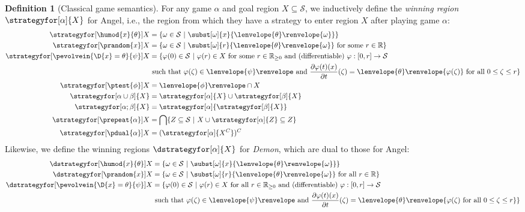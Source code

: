 \documentclass[12pt]{cmuthesis}
\theoremstyle{definition}
\newtheorem{definition}{Definition}
\theoremstyle{remark}
\newcommand{\ivr}{\psi}
\newcommand{\allstate}{\mathcal{S}}
\newcommand{\om}{\omega}
\newcommand{\tint}[2]{\lenvelope{#1}\renvelope{#2}}
\newcommand{\fint}[1]{\lenvelope{#1}\renvelope}
\begin{document}
\begin{definition}[Classical game semantics]\label{def:dgl-sem-game}
For any game $\alpha$ and goal region $X \subseteq \allstate$, we inductively define the \emph{winning region} $\strategyfor[\alpha]{X}$ for Angel, i.e., the region from which they have a strategy to enter region $X$ after playing game $\alpha$:
\begin{align*}
\strategyfor[\humod{x}{\theta}]{X} &= \{ \om \in \allstate~|~\subst[\om]{x}{\tint{\theta}{\om}}\} \\
\strategyfor[\prandom{x}]{X}       &= \{ \om \in \allstate~|~\subst[\om]{r}{\tint{\theta}{\om}}\text{ for some }r \in \mathbb{R}\} \\
\strategyfor[\pevolvein{\D{x}=\theta}{\ivr}]{X} &= \{\varphi(0) \in \allstate~|~\varphi(r) \in X\text{ for some }r \in \mathbb{R}_{\geq0}\text{ and (differentiable) }\varphi:[0,r]\to \allstate\\
&\text{ such that }\varphi(\zeta) \in \fint{\ivr}\text{ and } \frac{\partial \varphi(t)(x)}{\partial t}(\zeta) = \tint{\theta}{\varphi(\zeta)}\text{ for all }0 \leq \zeta \leq r \}\\
\strategyfor[\ptest{\phi}]{X}      &= \fint{\phi} \cap X \\
\strategyfor[\alpha \cup \beta]{X} &= \strategyfor[\alpha]{X} \cup \strategyfor[\beta]{X}\\
\strategyfor[\alpha;\beta]{X}      &= \strategyfor[\alpha]{\strategyfor[\beta]{X}}\\
\strategyfor[\prepeat{\alpha}]{X}  &= \bigcap\{Z \subseteq \allstate~|~ X \cup \strategyfor[\alpha]{Z} \subseteq Z\}\\
\strategyfor[\pdual{\alpha}]{X}    &= (\strategyfor[\alpha]{X^C})^C
\end{align*}
Likewise, we define the winning regions $\dstrategyfor[\alpha]{X}$ for \emph{Demon}, which are dual to those for Angel:
\begin{align*}
\dstrategyfor[\humod{x}{\theta}]{X} &= \{ \om \in \allstate~|~\subst[\om]{x}{\tint{\theta}{\om}}\}\\
\dstrategyfor[\prandom{x}]{X}       &= \{ \om \in \allstate~|~\subst[\om]{r}{\tint{\theta}{\om}}\text{ for all }r \in \mathbb{R}\} \\
\dstrategyfor[\pevolvein{\D{x}=\theta}{\ivr}]{X} &= \{\varphi(0) \in \allstate~|~\varphi(r) \in X\text{ for all }r \in \mathbb{R}_{\geq0}\text{ and (differentiable) }\varphi:[0,r]\to\allstate\\
&\text{ such that }\varphi(\zeta) \in \fint{\ivr}\text{ and }\frac{\partial\varphi(t)(x)}{\partial t}(\zeta) = \tint{\theta}{\varphi(\zeta)\text{ for all }0 \leq \zeta \leq r}\}\\

\end{align*}
\end{definition}
\end{document}
